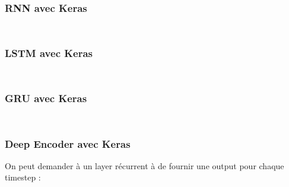 \begin{frame}
  \frametitle{RNN avec Keras}
  \inputminted[linenos,fontsize=\small,bgcolor=pythonbg]{python}{code/tf-keras-rnn.py}
  \inputminted[linenos,fontsize=\small,bgcolor=returnbg]{python}{code/tf-keras-rnn.txt}
\end{frame}

\begin{frame}
  \frametitle{LSTM avec Keras}
  \inputminted[linenos,fontsize=\small,bgcolor=pythonbg]{python}{code/tf-keras-lstm.py}
  \inputminted[linenos,fontsize=\small,bgcolor=returnbg]{python}{code/tf-keras-lstm.txt}
\end{frame}

\begin{frame}
  \frametitle{GRU avec Keras}
  \inputminted[linenos,fontsize=\small,bgcolor=pythonbg]{python}{code/tf-keras-gru.py}
  \inputminted[linenos,fontsize=\small,bgcolor=returnbg]{python}{code/tf-keras-gru.txt}
\end{frame}

\begin{frame}
  \frametitle{Deep Encoder avec Keras}
  On peut demander à un layer récurrent à de fournir une output pour chaque timestep :
  \inputminted[linenos,fontsize=\small,bgcolor=pythonbg]{python}{code/tf-keras-rnn-all-timestep.py}
  \inputminted[linenos,fontsize=\small,bgcolor=returnbg]{python}{code/tf-keras-gru.txt}
\end{frame}

